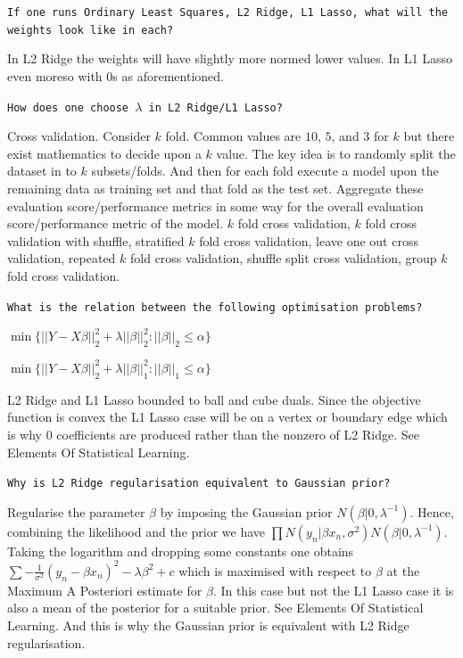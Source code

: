 \texttt{If one runs Ordinary Least Squares, L2 Ridge, L1 Lasso, what will the weights look like in each?}

In L2 Ridge the weights will have slightly more normed lower values. In L1 Lasso even moreso with $0$s as aforementioned.

\texttt{How does one choose $\lambda$ in L2 Ridge/L1 Lasso?}

Cross validation. Consider $k$ fold. Common values are $10$, $5$, and $3$ for $k$ but there exist mathematics to decide upon a $k$ value. The key idea is to randomly split the dataset in to $k$ subsets/folds. And then for each fold execute a model upon the remaining data as training set and that fold as the test set. Aggregate these evaluation score/performance metrics in some way for the overall evaluation score/performance metric of the model. $k$ fold cross validation, $k$ fold cross validation with shuffle, stratified $k$ fold cross validation, leave one out cross validation, repeated $k$ fold cross validation, shuffle split cross validation, group $k$ fold cross validation.

\texttt{What is the relation between the following optimisation problems?}

$\min \{ ||Y - X \beta||_2^2 + \lambda ||\beta||_2^2 : ||\beta||_2 \le \alpha \}$

$\min \{ ||Y - X \beta||_2^2 + \lambda ||\beta||_1^2 : ||\beta||_1 \le \alpha \}$

L2 Ridge and L1 Lasso bounded to ball and cube duals. Since the objective function is convex the L1 Lasso case will be on a vertex or boundary edge which is why $0$ coefficients are produced rather than the nonzero of L2 Ridge. See Elements Of Statistical Learning.

\texttt{Why is L2 Ridge regularisation equivalent to Gaussian prior?}

Regularise the parameter $\beta$ by imposing the Gaussian prior $N(\beta | 0,\lambda^{-1})$. Hence, combining the likelihood and the prior we have $\prod N(y_n | \beta x_n,\sigma^2)N(\beta | 0,\lambda^{-1})$. Taking the logarithm and dropping some constants one obtains $\sum -\frac{1}{\sigma^2} (y_n - \beta x_n)^2 - \lambda \beta^2 + c$ which is maximised with respect to $\beta$ at the Maximum A Posteriori estimate for $\beta$. In this case but not the L1 Lasso case it is also a mean of the posterior for a suitable prior. See Elements Of Statistical Learning. And this is why the Gaussian prior is equivalent with L2 Ridge regularisation.

